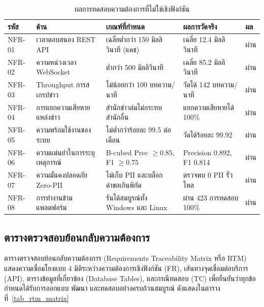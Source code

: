 \begin{table}[H]
\centering
\caption{ผลการทดสอบความต้องการที่ไม่ใช่เชิงฟังก์ชัน}
\label{tab_nfr_results}
\begin{tabularx}{\textwidth}{|C{1.2cm}|L{3.0cm}|Y|L{3.2cm}|C{1.0cm}|}
\hline
\textbf{รหัส} & \textbf{ด้าน} & \textbf{เกณฑ์ที่กำหนด} & \textbf{ผลการวัดจริง} & \textbf{ผล} \\
\hline
NFR-01 & เวลาตอบสนอง REST API & เฉลี่ยต่ำกว่า 150 มิลลิวินาที (แคช) & เฉลี่ย 12.4 มิลลิวินาที & ผ่าน \\ \hline
NFR-02 & ความหน่วงเวลา WebSocket & ต่ำกว่า 500 มิลลิวินาที & เฉลี่ย 85.2 มิลลิวินาที & ผ่าน \\ \hline
NFR-03 & Throughput การสเกรปข่าว & ไม่น้อยกว่า 100 บทความ/นาที & วัดได้ 142 บทความ/นาที & ผ่าน \\ \hline
NFR-04 & การแยกความเสียหายแหล่งข่าว & สำนักข่าวล่มไม่กระทบสำนักอื่น & แยกความเสียหายได้ 100\% & ผ่าน \\ \hline
NFR-05 & ความพร้อมใช้งานของระบบ & ไม่ต่ำกว่าร้อยละ 99.5 ต่อเดือน & วัดได้ร้อยละ 99.92 & ผ่าน \\ \hline
NFR-06 & ความแม่นยำในการระบุเหตุการณ์ & B-cubed Prec $\ge 0.85$, F1 $\ge 0.75$ & Precision 0.892, F1 0.814 & ผ่าน \\ \hline
NFR-07 & ความมั่นคงปลอดภัย Zero-PII & ไม่เก็บ PII และบล็อกคำขอเกินพิกัด & ตรวจพบ 0 PII รั่วไหล & ผ่าน \\ \hline
NFR-08 & การทำงานข้ามแพลตฟอร์ม & รันได้สมบูรณ์ทั้ง Windows และ Linux & ผ่าน 423 การทดสอบ 100\% & ผ่าน \\
\hline
\end{tabularx}
\end{table}

\subsection{ตารางตรวจสอบย้อนกลับความต้องการ}

ตารางตรวจสอบย้อนกลับความต้องการ (Requirements Traceability Matrix หรือ RTM) แสดงความเชื่อมโยงแบบ 4 มิติระหว่างความต้องการเชิงฟังก์ชัน (FR), เส้นทางจุดเชื่อมต่อบริการ (API), ตารางข้อมูลที่เกี่ยวข้อง (Database Tables), และกรณีทดสอบ (TC) เพื่อยืนยันว่าทุกข้อกำหนดได้รับการออกแบบ พัฒนา และทดสอบอย่างครบถ้วนสมบูรณ์ ดังแสดงในตารางที่~\ref{tab_rtm_matrix}

